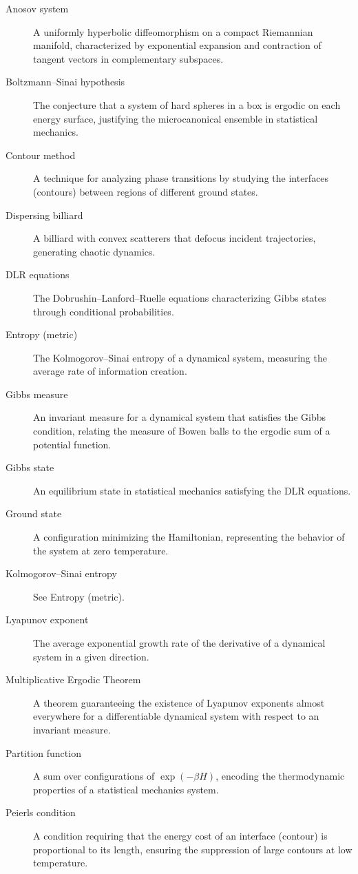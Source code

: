 \begin{description}
  \item[Anosov system] A uniformly hyperbolic diffeomorphism on a compact Riemannian manifold, characterized by exponential expansion and contraction of tangent vectors in complementary subspaces.
  \item[Boltzmann--Sinai hypothesis] The conjecture that a system of hard spheres in a box is ergodic on each energy surface, justifying the microcanonical ensemble in statistical mechanics.
  \item[Contour method] A technique for analyzing phase transitions by studying the interfaces (contours) between regions of different ground states.
  \item[Dispersing billiard] A billiard with convex scatterers that defocus incident trajectories, generating chaotic dynamics.
  \item[DLR equations] The Dobrushin--Lanford--Ruelle equations characterizing Gibbs states through conditional probabilities.
  \item[Entropy (metric)] The Kolmogorov--Sinai entropy of a dynamical system, measuring the average rate of information creation.
  \item[Gibbs measure] An invariant measure for a dynamical system that satisfies the Gibbs condition, relating the measure of Bowen balls to the ergodic sum of a potential function.
  \item[Gibbs state] An equilibrium state in statistical mechanics satisfying the DLR equations.
  \item[Ground state] A configuration minimizing the Hamiltonian, representing the behavior of the system at zero temperature.
  \item[Kolmogorov--Sinai entropy] See Entropy (metric).
  \item[Lyapunov exponent] The average exponential growth rate of the derivative of a dynamical system in a given direction.
  \item[Multiplicative Ergodic Theorem] A theorem guaranteeing the existence of Lyapunov exponents almost everywhere for a differentiable dynamical system with respect to an invariant measure.
  \item[Partition function] A sum over configurations of \(\exp(-\beta H)\), encoding the thermodynamic properties of a statistical mechanics system.
  \item[Peierls condition] A condition requiring that the energy cost of an interface (contour) is proportional to its length, ensuring the suppression of large contours at low temperature.

\end{description}
